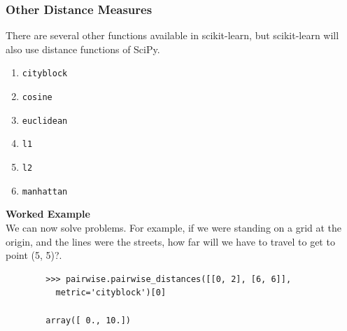 \documentclass[SKL-MASTER.tex]{subfiles}
\begin{document}
	\subsubsection*{Other Distance Measures}
	There are several other functions available in scikit-learn, but scikit-learn will also use
	distance functions of SciPy. 
	\begin{enumerate}
		\item \texttt{cityblock}
		\item \texttt{cosine}
		\item \texttt{euclidean}
		\item \texttt{l1}
		\item \texttt{l2}
		\item \texttt{manhattan}
	\end{enumerate}
	\newpage
	\noindent \textbf{Worked Example} \\ We can now solve problems. For example, if we were standing on a grid at the origin, and the
	lines were the streets, how far will we have to travel to get to point (5, 5)?.
	\begin{framed}
		\begin{verbatim}
		>>> pairwise.pairwise_distances([[0, 2], [6, 6]], 
		  metric='cityblock')[0]
		
		array([ 0., 10.])
		\end{verbatim}
	\end{framed}
\end{document}
